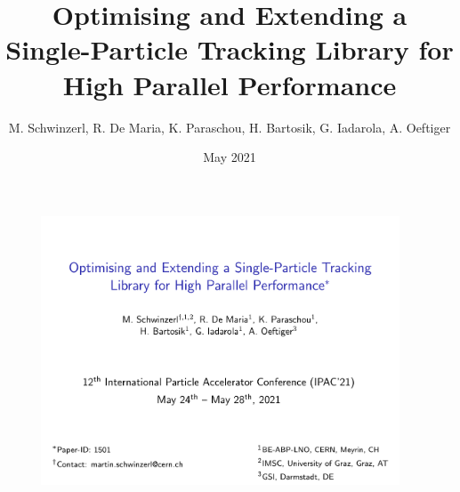 \documentclass{beamer}
\title[SixTrackLib]{Optimising and Extending a Single-Particle Tracking Library for High Parallel Performance} %
\author[Schwinzerl et al]{M. Schwinzerl, R. De Maria, K. Paraschou, H. Bartosik, G. Iadarola, A. Oeftiger
\institute[CERN, GSI]{CERN, GSI} %
}
\date{May 2021} %
\begin{document}
\begin{frame}
\begin{figure}
 \centering
 \includegraphics[width=0.95\textwidth]{poster_images/fig_title}
\end{figure}
\end{frame}
\end{document}
